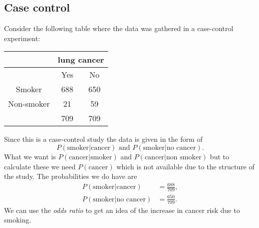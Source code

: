 \subsection{Case control}
Consider the following table where the data was gathered in a case-control experiment:
\begin{center}
    \begin{tabular}{c|cc}
        &\multicolumn{2}{c}{lung cancer}\\
        \hline 
        &Yes&No\\
        \hline 
        Smoker&688 &650\\
        Non-smoker&21&59\\
        \hline 
        &709&709
        
    \end{tabular}
\end{center}
Since this is a case-control study the data is given in the form of \[P(\text{smoker}|\text{cancer}) \text{ and } P(\text{smoker}|\text{no cancer}).\] What we want is $P(\text{cancer}|\text{smoker})$ and $P(\text{cancer}|\text{non smoker})$ but to calculate these we need $P(\text{cancer})$ which is not available due to the structure of the study. The probabilities we do have are
\begin{align*}
    P(\text{smoker}|\text{cancer})&= \frac{688}{709},\\
    P(\text{smoker}|\text{no cancer}) &=\frac{650}{709}.
\end{align*}
We can use the \emph{odds ratio} to get an idea of the increase in cancer risk due to smoking. 
